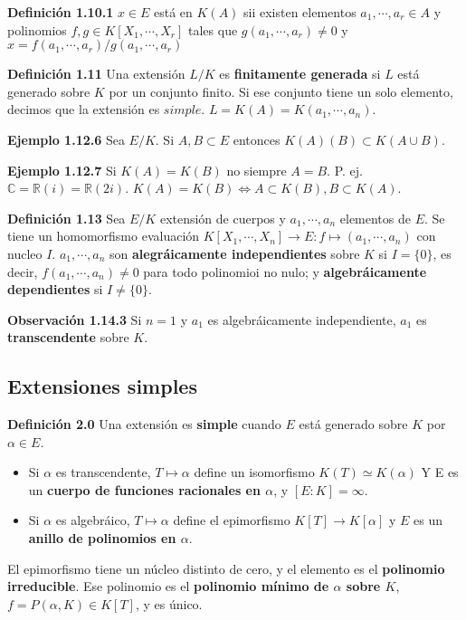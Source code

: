 \documentclass[a4paper, 11pt]{extarticle}
\newcommand{\defi}[1]{\textcolor{azul}{\textbf{Definición #1}}}
\newcommand{\obs}[1]{\textcolor{verde}{\textbf{Observación #1}}}
\newcommand{\ejem}[1]{\textcolor{verde}{\textbf{Ejemplo #1}}}
\begin{document}
\begin{multicols*}{2}
\defi{1.10.1} \(x \in E\) está en \(K(A)\) sii existen elementos \(a_1,
\cdots, a_r \in A\) y polinomios \(f,g \in K[X_1, \cdots, X_r]\) tales que \(g(a_1, \cdots, a_r) \neq 0\) y \(x = f(a_1, \cdots, a_r)/g(a_1, \cdots, a_r)\)

\defi{1.11} Una extensión \(L/K\) es \textbf{finitamente generada} si \(L\) está
generado sobre \(K\) por un conjunto finito. Si ese conjunto tiene un solo
elemento, decimos que la extensión es \(simple\).
\(L = K(A) = K(a_1, \cdots, a_n)\).

\ejem{1.12.6} Sea \(E/K\). Si \(A,B \subset E\) entonces \(K(A)(B) \subset
K(A \cup B)\).

\ejem{1.12.7} Si \(K(A) = K(B)\) no siempre \(A = B\). P. ej. \(\mathbb{C}
= \mathbb{R}(i) = \mathbb{R}(2i)\). \(K(A) = K(B) \iff A \subset K(B), B
\subset K(A)\).

\defi{1.13} Sea \(E/K\) extensión de cuerpos y \(a_1, \cdots, a_n\)
elementos de \(E\). Se tiene un homomorfismo evaluación \(K[X_1, \cdots, X_n]
\rightarrow  E: f \mapsto (a_1, \cdots, a_n)\) con nucleo \(I\). \(a_1,
\cdots, a_n\) son \textbf{alegráicamente independientes} sobre \(K\) si \(I = \{ 0 \}\), es decir,  \(f(a_1, \cdots, a_n) \neq 0\) para todo polinomioi no nulo; y
\textbf{algebráicamente dependientes} si \(I \neq \{ 0 \}\).

\obs{1.14.3} Si \(n = 1\) y \(a_1\) es algebráicamente independiente, \(a_1\) es \textbf{transcendente} sobre \(K\).



\vspace{-1.5em}
\subsection*{Extensiones simples}
\label{sec:org26194a5}
\vspace{-1.5em}
\defi{2.0} Una extensión es \textbf{simple} cuando \(E\) está generado sobre \(K\)
por \(\alpha \in E\).  
\begin{itemize}
\item Si \(\alpha\) es transcendente, \(T \mapsto \alpha\) define un isomorfismo \(K(T) \simeq K(\alpha)\) Y E es un \textbf{cuerpo de funciones racionales en \(\alpha\)}, y \([E:K] = \infty\).
\item Si \(\alpha\) es algebráico, \(T \mapsto \alpha\) define el epimorfismo
\(K[T] \rightarrow  K[\alpha]\) y \(E\) es un \textbf{anillo de polinomios en \(\alpha\)}.
\end{itemize}
El epimorfismo tiene un núcleo distinto de cero, y el elemento es el \textbf{polinomio
irreducible}. Ese polinomio es el \textbf{polinomio mínimo de \(\alpha\) sobre \(K\)},
\(f = P(\alpha, K) \in K[T]\), y es único.


\end{multicols*}
\end{document}
